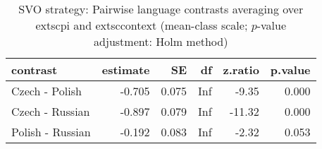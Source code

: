 \begin{table}[!h]
\centering
\caption{SVO strategy: Pairwise language contrasts averaging over 	extsc{pi} and 	extsc{context} (mean-class scale; $p$-value adjustment: Holm method)}
\centering
\begin{tabular}[t]{lrrrrr}
\toprule
contrast & estimate & SE & df & z.ratio & p.value\\
\midrule
Czech - Polish & -0.705 & 0.075 & Inf & -9.35 & 0.000\\
Czech - Russian & -0.897 & 0.079 & Inf & -11.32 & 0.000\\
Polish - Russian & -0.192 & 0.083 & Inf & -2.32 & 0.053\\
\bottomrule
\end{tabular}
\end{table}
